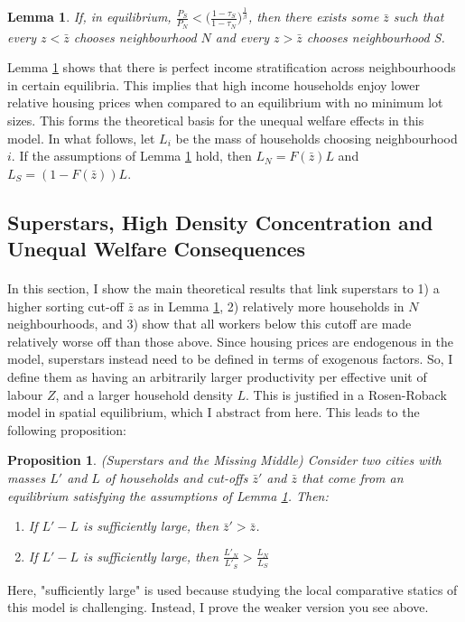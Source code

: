 \documentclass[]{article}
\theoremstyle{plain}
\newtheorem{lem}[thm]{Lemma}
\newtheorem{prop}{Proposition}
\begin{document}
\begin{lem}\label{incomesorting}
	If, in equilibrium, $\frac{P_{S}}{P_{N}} < \bigg(\frac{1-\tau_{S}}{1-\tau_{N}}\bigg)^{\frac{1}{\beta}}$, then there exists some $\bar{z}$ such that every $z < \bar{z}$ chooses neighbourhood $N$ and every $z > \bar{z}$ chooses neighbourhood S. 
\end{lem}
Lemma \ref{incomesorting} shows that there is perfect income stratification across neighbourhoods in certain equilibria. This implies that high income households
 enjoy lower relative housing prices when compared to an equilibrium with no minimum lot sizes. This forms the theoretical basis for the unequal welfare effects in this model. In what follows, let $L_{i}$ be the mass of households choosing neighbourhood $i$. If the assumptions of Lemma \ref{incomesorting} hold, then $L_{N} = F(\bar{z})L$ and $L_{S} = (1-F(\bar{z}))L$. 

\subsection{Superstars, High Density Concentration and Unequal Welfare Consequences}
\paragraph*{}
In this section, I show the main theoretical results that link superstars to 1) a higher sorting cut-off $\bar{z}$ as in Lemma \ref{incomesorting}, 2) relatively more households in $N$ neighbourhoods, and 3) show that all workers below this cutoff are made relatively worse off than those above. Since housing prices are endogenous in the model, superstars instead need to be defined in terms of exogenous factors. So, I define them as having an arbitrarily larger productivity per effective unit of labour $Z$, and a larger household density $L$. This is justified in a Rosen-Roback model in spatial equilibrium, which I abstract from here. This leads to the following proposition:
\begin{prop}\label{highdensityMM}
	 (Superstars and the Missing Middle) Consider two cities with masses $L'$ and $L$ of households and cut-offs $\bar{z}'$ and $\bar{z}$ that come from an equilibrium satisfying the assumptions of Lemma \ref{incomesorting}. Then:
	\begin{enumerate}
		\item If $L' - L$ is sufficiently large, then $\bar{z}' > \bar{z}$.
		\item  If $L' - L$ is sufficiently large, then $\frac{L'_{N}}{L'_{S}} > \frac{L_{N}}{L_{S}}$ 
	\end{enumerate} 
\end{prop}
Here, "sufficiently large" is used because studying the local comparative statics of this model is challenging. Instead, I prove the weaker version you see above.
\end{document}
